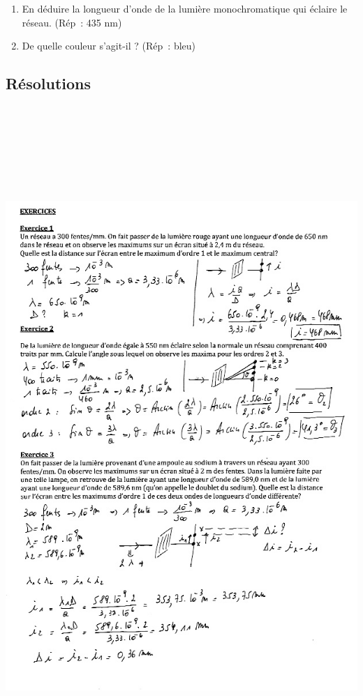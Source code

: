 \begin{enumerate}
\item  En déduire la longueur d'onde de la lumière monochromatique qui
  éclaire le réseau. (Rép~: 435 nm)
\item  De quelle couleur s'agit-il ? (Rép~: bleu)
\end{enumerate}

\subsection{Résolutions}

\includegraphics[width=18.503cm,height=25.788cm]{Pictures/1000000100000267000003591812743A6BDA8B59.png}

